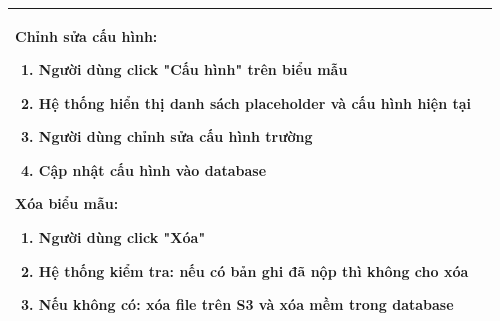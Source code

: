 \begin{table}[H]
\begin{tabular}{|m{}|m{}|}
    \textbf{Chỉnh sửa cấu hình:}
    \begin{enumerate}
        \item Người dùng click "Cấu hình" trên biểu mẫu
        \item Hệ thống hiển thị danh sách placeholder và cấu hình hiện tại
        \item Người dùng chỉnh sửa cấu hình trường
        \item Cập nhật cấu hình vào database
    \end{enumerate}

    \textbf{Xóa biểu mẫu:}
    \begin{enumerate}
        \item Người dùng click "Xóa"
        \item Hệ thống kiểm tra: nếu có bản ghi đã nộp thì không cho xóa
        \item Nếu không có: xóa file trên S3 và xóa mềm trong database
    \end{enumerate}
    \\ \hline
    \end{tabular}
    \end{table}

